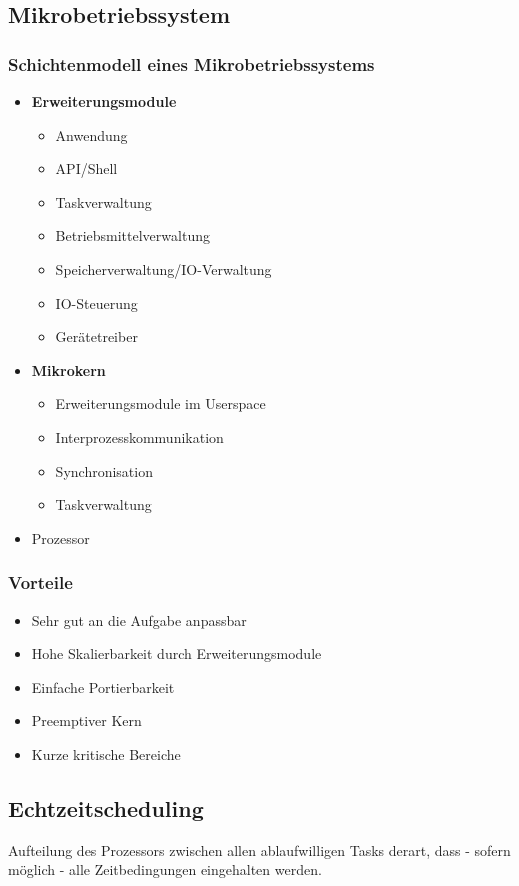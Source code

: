\subsection{Mikrobetriebssystem}

\subsubsection{Schichtenmodell eines Mikrobetriebssystems}
\begin{itemize}
	\item \textbf{Erweiterungsmodule}
	\begin{itemize}
		\item Anwendung
		\item API/Shell
		\item Taskverwaltung
		\item Betriebsmittelverwaltung
		\item Speicherverwaltung/IO-Verwaltung
		\item IO-Steuerung
		\item Gerätetreiber
	\end{itemize}
	\item \textbf{Mikrokern}
	\begin{itemize}
		\item Erweiterungsmodule im Userspace
		\item Interprozesskommunikation
		\item Synchronisation
		\item Taskverwaltung
	\end{itemize}
	\item Prozessor
\end{itemize}

\subsubsection{Vorteile}
\begin{itemize}
	\item Sehr gut an die Aufgabe anpassbar
	\item Hohe Skalierbarkeit durch Erweiterungsmodule
	\item Einfache Portierbarkeit
	\item Preemptiver Kern
	\item Kurze kritische Bereiche
\end{itemize}


\subsection{Echtzeitscheduling}
Aufteilung des Prozessors zwischen allen ablaufwilligen Tasks derart, dass - sofern möglich - alle Zeitbedingungen eingehalten werden.


